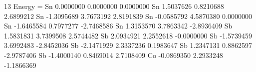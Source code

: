 13
Energy =
Sn    0.0000000    0.0000000    0.0000000
Sn    1.5037626    0.8210688    2.6899212
Sn   -1.3095689    3.7673192    2.8191839
Sn   -0.0585792    4.5870380    0.0000000
Sn   -1.6465584    0.7977277   -2.7468586
Sn    1.3153570    3.7863342   -2.8936409
Sb    1.5831831    3.7399508    2.5744482
Sb    2.0934921    2.2552618   -0.0000000
Sb   -1.5739459    3.6992483   -2.8452036
Sb   -2.1471929    2.3337236    0.1983647
Sb    1.2347131    0.8862597   -2.9787406
Sb   -1.4000140    0.8469014    2.7108409
Co   -0.0869350    2.2933248   -1.1866369